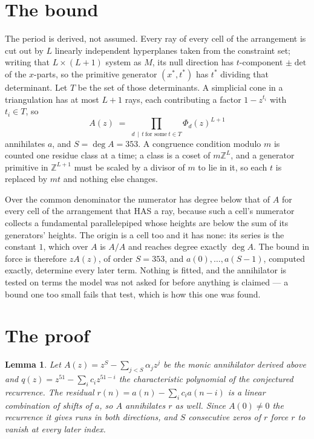 \documentclass[11pt,a4paper]{article}
\theoremstyle{plain}
\newtheorem{lemma}[theorem]{Lemma}
\theoremstyle{definition}
\begin{document}
\section{The bound}

The period is derived, not assumed. Every ray of every cell of the arrangement is cut out by
$L$ linearly independent hyperplanes taken from the constraint set; writing that $L\times(L+1)$
system as $M$, its null direction has $t$-component $\pm\det$ of the $x$-parts, so the
primitive generator $(x^*,t^*)$ has $t^*$ dividing that determinant. Let $T$ be the set of
those determinants. A simplicial cone in a triangulation has at most $L+1$ rays, each
contributing a factor $1-z^{t_i}$ with $t_i\in T$, so
\[
A(z)\;=\;\prod_{d\,\mid\,t\ \text{for some}\ t\in T}\Phi_d(z)^{L+1}
\]
annihilates $a$, and $S=\deg A=353$. A congruence condition modulo $m$ is counted one residue
class at a time; a class is a coset of $m\mathbb{Z}^L$, and a generator primitive in
$\mathbb{Z}^{L+1}$ must be scaled by a divisor of $m$ to lie in it, so each $t$ is replaced
by $mt$ and nothing else changes.

Over the common denominator the numerator has degree below that of $A$ for every cell of the
arrangement that HAS a ray, because such a cell's numerator collects a fundamental
parallelepiped whose heights are below the sum of its generators' heights. The origin is a cell
too and it has none: its series is the constant $1$, which over $A$ is $A/A$ and reaches degree
exactly $\deg A$. The bound in force is therefore $zA(z)$, of order $S=353$, and
$a(0),\dots,a(S-1)$, computed exactly, determine every later term. Nothing is fitted, and the
annihilator is tested on terms the model was not asked for before anything is claimed --- a
bound one too small fails that test, which is how this one was found.

\section{The proof}

\begin{lemma}\label{lem:crit}
Let $A(z)=z^S-\sum_{j<S}\alpha_jz^{j}$ be the monic annihilator derived above and
$q(z)=z^{51}-\sum_ic_iz^{51-i}$ the characteristic polynomial of the conjectured
recurrence. The residual $r(n)=a(n)-\sum_ic_ia(n-i)$ is a linear combination of shifts of $a$,
so $A$ annihilates $r$ as well. Since $A(0)\ne0$ the recurrence it gives runs in both
directions, and $S$ consecutive zeros of $r$ force $r$ to vanish at every later index.
\end{lemma}
\end{document}
